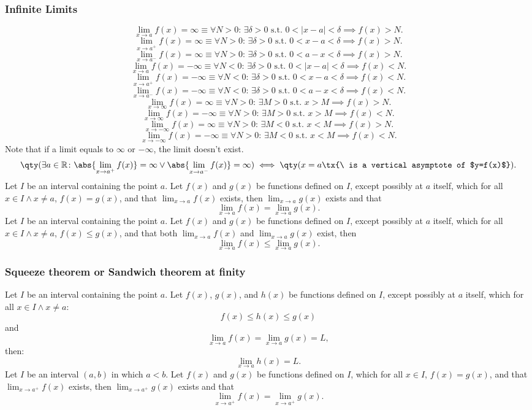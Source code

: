 \documentclass[a4paper,12pt]{report}
\begin{document}
\subsubsection{Infinite Limits}
\[\lim_{x\to a}f(x)=\infty \equiv \forall N > 0:\, \exists \delta > 0 \text{\ s.t.\ } 0 < |x - a| < \delta \implies f(x) > N.\]
\[\lim_{x\to a^+}f(x)=\infty \equiv \forall N > 0:\, \exists \delta > 0 \text{\ s.t.\ } 0 < x - a < \delta \implies f(x) > N.\]
\[\lim_{x\to a^-}f(x)=\infty \equiv \forall N > 0:\, \exists \delta > 0 \text{\ s.t.\ } 0 < a - x < \delta \implies f(x) > N.\]
\[\lim_{x\to a}f(x)=-\infty \equiv \forall N < 0:\, \exists \delta > 0 \text{\ s.t.\ } 0 < |x - a| < \delta \implies f(x) < N.\]
\[\lim_{x\to a^+}f(x)=-\infty \equiv \forall N < 0:\, \exists \delta > 0 \text{\ s.t.\ } 0 < x - a < \delta \implies f(x) < N.\]
\[\lim_{x\to a^-}f(x)=-\infty \equiv \forall N < 0:\, \exists \delta > 0 \text{\ s.t.\ } 0 < a - x < \delta \implies f(x) < N.\]
\[\lim_{x\to\infty}f(x)=\infty \equiv \forall N > 0:\, \exists M > 0 \text{\ s.t.\ } x > M \implies f(x) > N.\]
\[\lim_{x\to\infty}f(x)=-\infty \equiv \forall N > 0:\, \exists M > 0 \text{\ s.t.\ } x > M \implies f(x) < N.\]
\[\lim_{x\to-\infty}f(x)=\infty \equiv \forall N > 0:\, \exists M < 0 \text{\ s.t.\ } x < M \implies f(x) > N.\]
\[\lim_{x\to-\infty}f(x)=-\infty \equiv \forall N > 0:\, \exists M < 0 \text{\ s.t.\ } x < M \implies f(x) < N.\]
Note that if a limit equals to $\infty$ or $-\infty$, the limit doesn't exist.
\[\qty(\exists a\in\mathbb{R}\colon\abs{\lim_{x \to a^+} f(x)}=\infty\lor\abs{\lim_{x \to a^-} f(x)}=\infty)\iff \qty(x=a\tx{\ is a vertical asymptote of $y=f(x)$}).\]
Let \(I\) be an interval containing the point \(a\). Let $f(x)$ and $g(x)$ be functions defined on \(I\), except possibly at \(a\) itself, which for all $x\in I\land x\neq a$, $f(x)=g(x)$, and that $\lim_{x\to a}f(x)$ exists, then $\lim_{x\to a}g(x)$ exists and that
\[\lim_{x\to a}f(x)=\lim_{x\to a}g(x).\]
Let \(I\) be an interval containing the point \(a\). Let $f(x)$ and $g(x)$ be functions defined on \(I\), except possibly at \(a\) itself, which for all $x\in I\land x\neq a$, $f(x)\leq g(x)$, and that both $\lim_{x\to a}f(x)$ and $\lim_{x\to a}g(x)$ exist, then
\[\lim_{x\to a}f(x)\leq\lim_{x\to a}g(x).\]
\subsubsection{Squeeze theorem or Sandwich theorem at finity}
Let \(I\) be an interval containing the point \(a\). Let $f(x)$, $g(x)$, and $h(x)$ be functions defined on \(I\), except possibly at \(a\) itself, which for all $x\in I\land x\neq a$:
\[f(x)\leq h(x)\leq g(x)\]
and
\[\lim_{x\to a}f(x)=\lim_{x\to a}g(x)=L,\]
then: 
\[\lim_{x\to a}h(x)=L.\]
Let \(I\) be an interval \((a,b)\) in which $a<b$. Let $f(x)$ and $g(x)$ be functions defined on \(I\), which for all $x\in I$, $f(x)=g(x)$, and that $\lim_{x\to a^+}f(x)$ exists, then $\lim_{x\to a^+}g(x)$ exists and that
\[\lim_{x\to a^+}f(x)=\lim_{x\to a^+}g(x).\]
\end{document}
